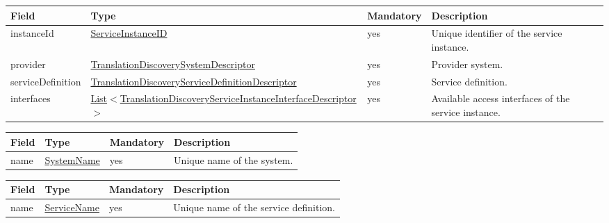\documentclass[a4paper]{arrowhead}
\newcommand{\pref}[1]{{\textcolor{ArrowheadGrey}{\hyperref[sec:model:primitives:#1]{#1}}}}
\begin{document}
\begin{table}[ht!]
\begin{tabularx}{\textwidth}{| p{3.9cm} | p{6.2cm} | p{2cm} | X |} \hline
\rowcolor{gray!33} Field & Type & Mandatory & Description \\ \hline
instanceId & \pref{ServiceInstanceID} & yes & Unique identifier of the service instance. \\ \hline
provider & \hyperref[sec:model:TranslationDiscoverySystemDescriptor]{Translation\-Discovery\-System\-Descriptor} & yes & Provider system. \\ \hline
serviceDefinition & \hyperref[sec:model:TranslationDiscoveryServiceDefinitionDescriptor]{Translation\-Discovery\-Service\-Definition\-Descriptor} & yes & Service definition. \\ \hline
interfaces & \pref{List}$<$\hyperref[sec:model:TranslationDiscoveryServiceInstanceInterfaceDescriptor]{Translation\-Discovery\-Service\-Instance\-Interface\-Descriptor}$>$ & yes & Available access interfaces of the service instance. \\ \hline
\end{tabularx}
\end{table}


\begin{table}[ht!]
\begin{tabularx}{\textwidth}{| p{3.9cm} | p{4cm} | p{2cm} | X |} \hline
\rowcolor{gray!33} Field & Type & Mandatory & Description \\ \hline
name & \pref{SystemName} & yes & Unique name of the system. \\ \hline
\end{tabularx}
\end{table}


\begin{table}[ht!]
\begin{tabularx}{\textwidth}{| p{3.9cm} | p{4cm} | p{2cm} | X |} \hline
\rowcolor{gray!33} Field & Type & Mandatory & Description \\ \hline
name & \pref{ServiceName} & yes & Unique name of the service definition. \\ \hline
\end{tabularx}
\end{table}

\end{document}

